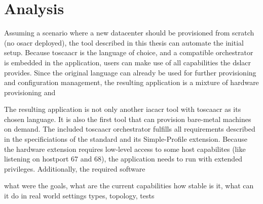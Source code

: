 \chapter{Analysis}









Assuming a scenario where a new datacenter should be provisioned from scratch (no \gls{osacr} deployed), the tool described in this thesis can automate the initial setup. Because \gls{toscaacr} is the language of choice, and a compatible orchestrator is embedded in the application, users can make use of all capabilities the \gls{dslacr} provides. Since the original language can already be used for further provisioning and configuration management, the resulting application is a mixture of hardware provisioning and 


The resulting application is not only another \gls{iacacr} tool with \gls{toscaacr} as its chosen language. It is also the first tool that can provision bare-metal machines on demand.
\newline
The included \gls{toscaacr} orchestrator fulfills all requirements described in the specificiations of the standard and its Simple-Profile extension. Because the hardware extension requires low-level access to some host capabilites (like listening on hostport 67 and 68), the application needs to run with extended privileges. Additionally, the required software



what were the goals, what are the current capabilities
\newline
how stable is it, what can it do in real world settings
\newline
types, topology, tests
